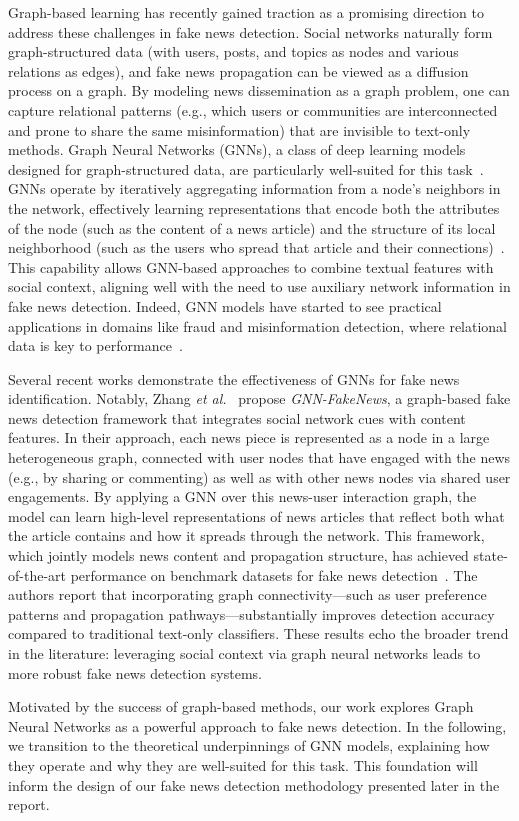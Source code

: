 Graph-based learning has recently gained traction as a promising direction to address these challenges in fake news detection. Social networks naturally form graph-structured data (with users, posts, and topics as nodes and various relations as edges), and fake news propagation can be viewed as a diffusion process on a graph. By modeling news dissemination as a graph problem, one can capture relational patterns (e.g., which users or communities are interconnected and prone to share the same misinformation) that are invisible to text-only methods. Graph Neural Networks (GNNs), a class of deep learning models designed for graph-structured data, are particularly well-suited for this task~\cite{SanchezLengeling2021}. GNNs operate by iteratively aggregating information from a node’s neighbors in the network, effectively learning representations that encode both the attributes of the node (such as the content of a news article) and the structure of its local neighborhood (such as the users who spread that article and their connections)~\cite{SanchezLengeling2021}. This capability allows GNN-based approaches to combine textual features with social context, aligning well with the need to use auxiliary network information in fake news detection. Indeed, GNN models have started to see practical applications in domains like fraud and misinformation detection, where relational data is key to performance~\cite{SanchezLengeling2021}.

Several recent works demonstrate the effectiveness of GNNs for fake news identification. Notably, Zhang \emph{et al.}~\cite{Zhang2024} propose \textit{GNN-FakeNews}, a graph-based fake news detection framework that integrates social network cues with content features. In their approach, each news piece is represented as a node in a large heterogeneous graph, connected with user nodes that have engaged with the news (e.g., by sharing or commenting) as well as with other news nodes via shared user engagements. By applying a GNN over this news-user interaction graph, the model can learn high-level representations of news articles that reflect both what the article contains and how it spreads through the network. This framework, which jointly models news content and propagation structure, has achieved state-of-the-art performance on benchmark datasets for fake news detection~\cite{Zhang2024}. The authors report that incorporating graph connectivity—such as user preference patterns and propagation pathways—substantially improves detection accuracy compared to traditional text-only classifiers. These results echo the broader trend in the literature: leveraging social context via graph neural networks leads to more robust fake news detection systems.

Motivated by the success of graph-based methods, our work explores Graph Neural Networks as a powerful approach to fake news detection. In the following, we transition to the theoretical underpinnings of GNN models, explaining how they operate and why they are well-suited for this task. This foundation will inform the design of our fake news detection methodology presented later in the report.
